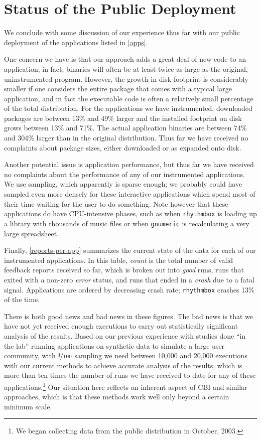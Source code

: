 \documentclass[10pt,twocolumn]{article}
\newcommand{\gnumeric}{\texttt{gnumeric}\xspace}
\newcommand{\rhythmbox}{\texttt{rhythmbox}\xspace}
\begin{document}
\section{Status of the Public Deployment}

We conclude with some discussion of our experience thus far with our public
deployment of the applications listed in \autoref{apps}.

One concern we have is that our approach adds a great deal of new code
to an application; in fact, binaries will often be at least twice as
large as the original, uninstrumented program.  However, the growth in
disk footprint is considerably smaller if one considers the entire
package that comes with a typical large application, and in fact the
executable code is often a relatively small percentage of the total
distribution.  For the applications we have instrumented, downloaded
packages are between 13\% and 49\% larger and the installed footprint
on disk grows between 13\% and 71\%.  The actual application binaries
are between 74\% and 304\% larger than in the original distribution.
Thus far we have received no complaints about package sizes, either
downloaded or as expanded onto disk.

Another potential issue is application performance, but thus far we
have received no complaints about the performance of any of our
instrumented applications.  We use  sampling, which
apparently is sparse enough; we probably could have sampled even more
densely for these interactive applications which spend most of their
time waiting for the user to do something.  Note however that 
these applications do have CPU-intensive phases, such as when
\rhythmbox is loading up a library with thousands of music files or
when \gnumeric is recalculating a very large spreadsheet.

Finally, \autoref{reports-per-app} summarizes the current state of
the data for each of our instrumented applications.  In this table,
\emph{count} is the total number of valid feedback reports received so far,
which is broken out into \emph{good} runs, runs that exited with a
non-zero \emph{error} status, and runs that ended in a \emph{crash} due to a
fatal signal.  Applications are ordered by decreasing crash rate;
\rhythmbox crashes 13\% of the time.

There is both good news and bad news in these figures.  The bad news
is that we have not yet received enough executions to carry out
statistically significant analysis of the results.  Based on our
previous experience with studies done ``in the lab'' running
applications on synthetic data to simulate a large user community,
with $\nicefrac{1}{100}$ sampling we need between 10,000 and 20,000
executions with our current methods to achieve accurate analysis of
the results, which is more than ten times the number of runs we have
received to date for any of these applications.\footnote{We began
collecting data from the public distribution in October, 2003.}  Our
situation here reflects an inherent aspect of CBI and similar
approaches, which is that these methods work well only beyond a
certain minimum scale.
\end{document}
